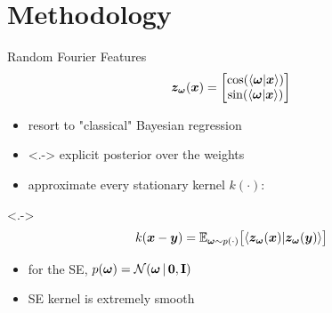 \documentclass[
	USenglish,
	aspectratio=43,
	color={accentcolor=1c},
	logo=true,
	colorframetitle=true,
	hyperref={pdfpagelabels=true},
]{tudabeamer}
\begin{document}
	\section{Methodology}
		\begin{frame}{Random Fourier Features}
			\begin{equation}
				\vec{z}_{\vec{\omega}}(\vec{x}) =
					\begin{bmatrix}
						\cos(\ip{\vec{\omega}}{\vec{x}}) \\
						\sin(\ip{\vec{\omega}}{\vec{x}})
					\end{bmatrix}
			\end{equation}
			\begin{itemize}
				\item<+-> resort to "classical" Bayesian regression
				\item<.-> explicit posterior over the weights
				\item<+-> approximate every stationary kernel \( k(\cdot) \):
			\end{itemize}
			\onslide<.->{
				\begin{gather}
					k(\vec{x} - \vec{y}) = \E_{\vec{\omega} \sim p(\cdot)}\bigl[ \ip{\vec{z}_{\vec{\omega}}(\vec{x})}{\vec{z}_{\vec{\omega}}(\vec{y})} \bigr]
				\end{gather}
			}
			\begin{itemize}
				\item<+-> for the SE, \( p(\bm{\omega}) = \mathcal{N}(\bm{\omega} \,\vert\, \bm{0}, \bm{\mathrm{I}}) \)
				\item<+-> SE kernel is extremely smooth
			\end{itemize}
		\end{frame}
\end{document}

